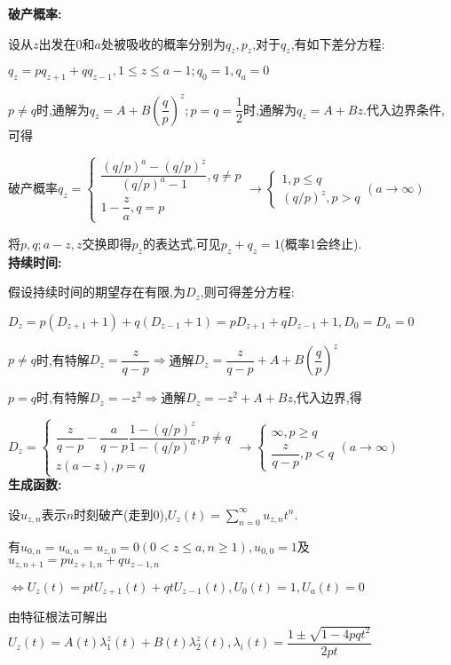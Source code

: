 \textbf{破产概率:}

设从$ z$出发在$ 0$和$a$处被吸收的概率分别为$ q_z,p_z$,对于$ q_z$,有如下差分方程:

$ q_z = pq_{z+1}+qq_{z-1}, 1\le z \le a-1; q_0=1,q_a=0$

$ p\ne q$时,通解为$ q_z=A+B(\dfrac{q}{p})^z; p = q = \dfrac{1}{2}$时,通解为$ q_z=A+Bz$.代入边界条件,可得

破产概率$ q_z=\begin{cases} \dfrac{(q/p)^a-(q/p)^z}{(q/p)^a - 1} , q\neq p \\ 1-\dfrac{z}{a}, q=p \end{cases}
\to  \begin{cases} 1, p\le q \\ (q/p)^z, p > q\end{cases} (a\to \infty)$

将$ p,q; a-z,z$交换即得$ p_z$的表达式,可见$ p_z+q_z=1$(概率1会终止).
\\

\textbf{持续时间:}

假设持续时间的期望存在有限,为$ D_z$,则可得差分方程:

$ D_z= p(D_{z+1}+1)+q(D_{z-1}+1) = pD_{z+1}+qD_{z-1}+1, D_0=D_a=0$

$ p\neq q$时,有特解$ D_z = \dfrac{z}{q-p}\Rightarrow $通解$ D_z = \dfrac{z}{q-p}+A+B(\dfrac{q}{p})^z$

$ p=q$时,有特解$ D_z = -z^2\Rightarrow $通解$ D_z=-z^2+A+Bz$,代入边界,得

$ D_z = \begin{cases}\dfrac{z}{q-p}-\dfrac{a}{q-p}\dfrac{1-(q/p)^z}{1-(q/p)^a}, p\neq q\\ z(a-z), p=q\end{cases} \to \begin{cases} \infty, p\ge q \\
  \dfrac{z}{q-p}, p < q \end{cases} (a\to \infty)$
\\

\textbf{生成函数:}

设$ u_{z,n}$表示$n$时刻破产(走到0),$ U_z(t) = \sum_{n=0}^\infty u_{z,n}t^n$.

有$ u_{0,n}=u_{a,n} = u_{z,0}=0 (0<z\le a, n\ge 1), u_{0,0}=1$及$ u_{z,n+1}=pu_{z+1,n}+qu_{z-1,n}$

$ \Leftrightarrow U_z(t) = ptU_{z+1}(t)+qtU_{z-1}(t), U_0(t) = 1, U_{a}(t) = 0$

  由特征根法可解出$ U_z(t) = A(t)\lambda_1^z(t)+B(t)\lambda_2^z(t),\lambda_i(t) = \dfrac{1\pm \sqrt{1-4pqt^2}}{2pt}$

